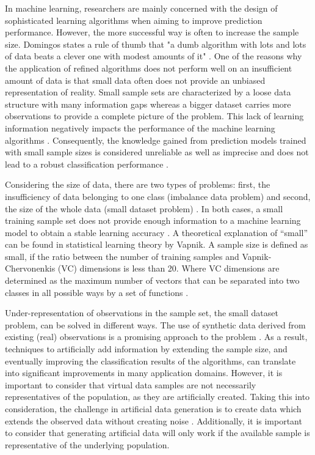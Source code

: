 \documentclass[parskip=full]{scrartcl}
\begin{document}
In machine learning, researchers are mainly concerned with the design of 
sophisticated learning algorithms when aiming to improve prediction 
performance. However, the more successful way is often to increase the sample 
size. Domingos states a rule of thumb that "a dumb algorithm with lots and lots 
of data beats a clever one with modest amounts of it" \cite{Domingos.2012}. One 
of the reasons why the application of refined algorithms does not perform well 
on an insufficient amount of data is that small data often does not provide an 
unbiased representation of reality. Small sample sets are characterized by a 
loose data structure with many information gaps whereas a bigger dataset 
carries more observations to provide a complete picture of the problem. This 
lack of learning information negatively impacts the performance of the machine 
learning algorithms \cite{Lin.2018}. Consequently, the knowledge gained from 
prediction models trained with small sample sizes is considered unreliable as 
well as imprecise and does not lead to a robust classification performance 
\cite{AbdulLateh.2017}.

Considering the size of data, there are two types of problems: first, the 
insufficiency of data belonging to one class (imbalance data problem) and 
second, the size of the whole data (small dataset problem) \cite{Sezer.2014}. 
In both cases, a small training sample set does not provide enough information 
to a machine learning model to obtain a stable learning accuracy 
\cite{Tsai.2008}. A theoretical explanation of “small” can be found in 
statistical learning theory by Vapnik. A sample size is defined as small, if 
the ratio between the number of training samples and Vapnik-Chervonenkis (VC) 
dimensions is less than 20. Where VC dimensions are determined as the maximum 
number of vectors that can be separated into two classes in all possible ways 
by a set of functions \cite{Vapnik.2008}. 

Under-representation of observations in the sample set, the small dataset 
problem, can be solved in different ways. The use of synthetic data derived 
from existing (real) observations is a promising approach to the problem 
\cite{Sezer.2014}. As a result, techniques to artificially add information by 
extending the sample size, and eventually improving the classification results 
of the algorithms, can translate into significant improvements in many 
application domains. However, it is important to consider that virtual data 
samples are not necessarily representatives of the population, as they are 
artificially created. Taking this into consideration, the challenge in 
artificial data generation is to create data which extends the observed data 
without creating noise \cite{Li.2006}. Additionally, it is important to 
consider that generating artificial data will only work if the available sample 
is representative of the underlying population.
\end{document}
